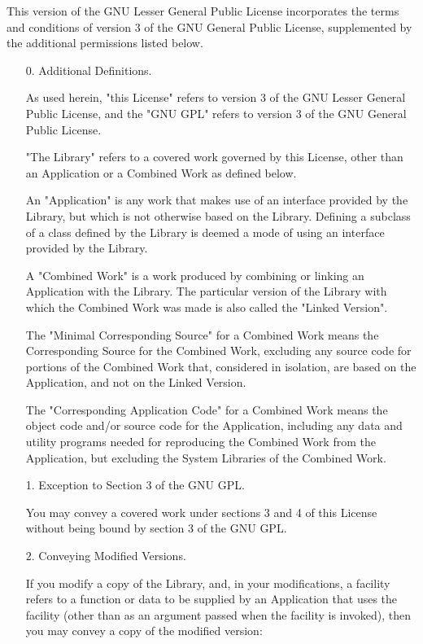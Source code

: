 \documentclass[twocolumn,twoside,fleqn,12pt]{article}
\begin{document}
This version of the GNU Lesser General Public License incorporates
the terms and conditions of version 3 of the GNU General Public
License, supplemented by the additional permissions listed below.

\begin{itemize}
  \item[0.] Additional Definitions.

  As used herein, "this License" refers to version 3 of the GNU Lesser
General Public License, and the "GNU GPL" refers to version 3 of the GNU
General Public License.

  "The Library" refers to a covered work governed by this License,
other than an Application or a Combined Work as defined below.

  An "Application" is any work that makes use of an interface provided
by the Library, but which is not otherwise based on the Library.
Defining a subclass of a class defined by the Library is deemed a mode
of using an interface provided by the Library.

  A "Combined Work" is a work produced by combining or linking an
Application with the Library.  The particular version of the Library
with which the Combined Work was made is also called the "Linked
Version".

  The "Minimal Corresponding Source" for a Combined Work means the
Corresponding Source for the Combined Work, excluding any source code
for portions of the Combined Work that, considered in isolation, are
based on the Application, and not on the Linked Version.

  The "Corresponding Application Code" for a Combined Work means the
object code and/or source code for the Application, including any data
and utility programs needed for reproducing the Combined Work from the
Application, but excluding the System Libraries of the Combined Work.

  \item[1.] Exception to Section 3 of the GNU GPL.

  You may convey a covered work under sections 3 and 4 of this License
without being bound by section 3 of the GNU GPL.

  \item[2.] Conveying Modified Versions.

  If you modify a copy of the Library, and, in your modifications, a
facility refers to a function or data to be supplied by an Application
that uses the facility (other than as an argument passed when the
facility is invoked), then you may convey a copy of the modified
version:


\end{itemize}
\end{document}
